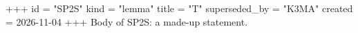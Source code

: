 +++
id = "SP2S"
kind = "lemma"
title = "T"
superseded_by = "K3MA"
created = 2026-11-04
+++
Body of SP2S: a made-up statement.
